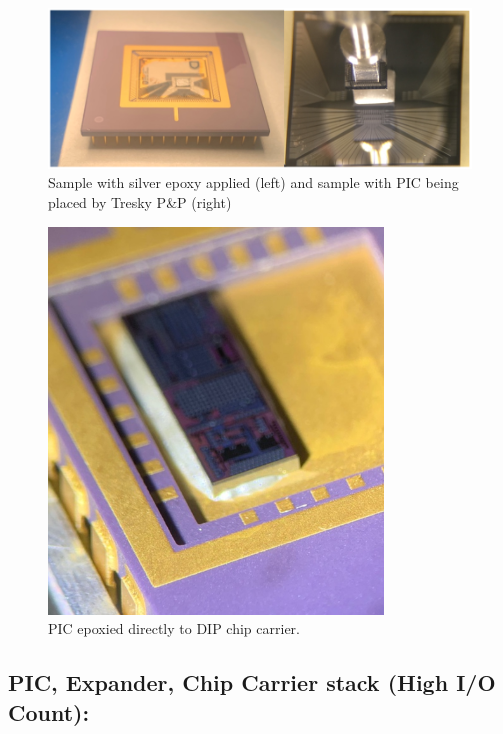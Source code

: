 \begin{figure}[!ht]
\centering
\includegraphics[width=5in]{./Figures/AppendixA/FigAppA11}
\caption[Pick and Place examples.]{Sample with silver epoxy applied (left) and sample with PIC being placed by Tresky P\&P (right)}
\label{FigAppA11}
\end{figure}

\begin{figure}[!ht]
\centering
\includegraphics[width=3.5in]{./Figures/AppendixA/FigAppA12}
\caption{PIC epoxied directly to DIP chip carrier.}
\label{FigAppA12}
\end{figure}

\subsection{PIC, Expander, Chip Carrier stack (High I/O Count):}

